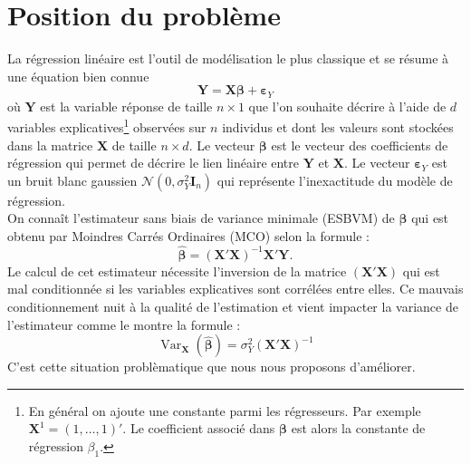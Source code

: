 \documentclass[12pt,a4paper]{report}
\begin{document}
	\section{Position du problème}
	La régression linéaire est l'outil de modélisation le plus classique et se résume à une équation bien connue%
	\begin{equation}
		\boldsymbol{Y}%
		=\boldsymbol{X}\boldsymbol{\beta}+\boldsymbol{\varepsilon}_Y \nonumber 
	\end{equation}
	où $\boldsymbol{Y}$ est la variable réponse de taille $n\times 1$ que l'on souhaite décrire à l'aide de $d$ variables explicatives\footnote{En général on ajoute une constante parmi les régresseurs. Par exemple $\boldsymbol{X}^1=(1,\ldots,1)'$. Le coefficient associé dans $\boldsymbol{\beta}$ est alors la constante de régression $\beta_1$.} observées sur $n$ individus et dont les valeurs sont stockées dans la matrice $\boldsymbol{X}$ de taille $n\times d$. Le vecteur $\boldsymbol{\beta}$ est le vecteur des coefficients de régression qui permet de décrire le lien linéaire entre $\boldsymbol{Y}$ et $\boldsymbol{X}$. Le vecteur $\boldsymbol{\varepsilon}_Y$  est un bruit blanc gaussien $\mathcal{N}(0,\sigma_Y^2\boldsymbol{I}_n)$ qui représente l'inexactitude du modèle de régression.\\
	
	On connaît l'estimateur sans biais de variance minimale (ESBVM) de $\boldsymbol{\beta}$ qui est obtenu par Moindres Carrés Ordinaires (MCO) selon la formule  :
	\begin{equation}
		\hat{\boldsymbol{\beta}}=(\boldsymbol{X}'\boldsymbol{X})^{-1}\boldsymbol{X}'\boldsymbol{Y}.  \nonumber 
	\end{equation}
	Le calcul de cet estimateur nécessite l'inversion de la matrice $(\boldsymbol{X}'\boldsymbol{X})$ qui est mal conditionnée si les variables explicatives sont corrélées entre elles. Ce mauvais conditionnement nuit à la qualité de l'estimation et vient impacter la variance de l'estimateur comme le montre la formule :
	\begin{equation}
		\operatorname{Var}_{\boldsymbol{X}}(\hat{\boldsymbol{\beta}})=\sigma_Y^2(\boldsymbol{X}'\boldsymbol{X})^{-1}  \nonumber 
	\end{equation}
	C'est cette situation problèmatique que nous nous proposons d'améliorer.
\end{document}
